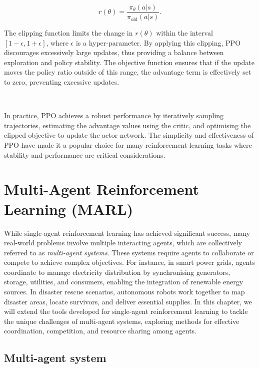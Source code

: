 \documentclass{article}
\begin{document}
\begin{equation}
r(\theta) = \frac{\pi_\theta(a|s)}{\pi_\text{old}(a|s)}.
\end{equation}

The clipping function limits the change in $r(\theta)$ within the interval $[1 - \epsilon, 1 + \epsilon]$, where $\epsilon$ is a hyper-parameter. By applying this clipping, PPO discourages excessively large updates, thus providing a balance between exploration and policy stability. The objective function ensures that if the update moves the policy ratio outside of this range, the advantage term is effectively set to zero, preventing excessive updates.

\

In practice, PPO achieves a robust performance by iteratively sampling trajectories, estimating the advantage values using the critic, and optimising the clipped objective to update the actor network. The simplicity and effectiveness of PPO have made it a popular choice for many reinforcement learning tasks where stability and performance are critical considerations.

\newpage

\section{Multi-Agent Reinforcement Learning (MARL)}

While single-agent reinforcement learning has achieved significant success, many real-world problems involve multiple interacting agents, which are collectively referred to as \textit{multi-agent systems}. These systems require agents to collaborate or compete to achieve complex objectives. For instance, in smart power grids, agents coordinate to manage electricity distribution by synchronising generators, storage, utilities, and consumers, enabling the integration of renewable energy sources. In disaster rescue scenarios, autonomous robots work together to map disaster areas, locate survivors, and deliver essential supplies. In this chapter, we will extend the tools developed for single-agent reinforcement learning to tackle the unique challenges of multi-agent systems, exploring methods for effective coordination, competition, and resource sharing among agents.

\subsection{Multi-agent system}
\end{document}
